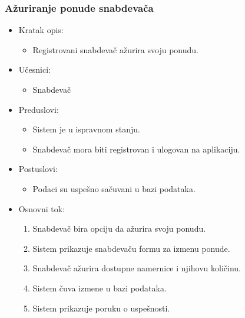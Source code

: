 \subsubsection{Ažuriranje ponude snabdevača}

\begin{itemize}
    \item Kratak opis:
        \begin{itemize}
            \item Registrovani snabdevač ažurira svoju ponudu.
        \end{itemize}
    \item Učesnici:
        \begin{itemize}
            \item Snabdevač
        \end{itemize}
    \item Preduslovi:
        \begin{itemize}
            \item Sistem je u ispravnom stanju.
            \item Snabdevač mora biti registrovan i ulogovan na aplikaciju.
        \end{itemize}
    \item Postuslovi:
        \begin{itemize}
            \item Podaci su uspešno sačuvani u bazi podataka.
        \end{itemize}
    \item Osnovni tok:
        \begin{enumerate}
            \item Snabdevač bira opciju da ažurira svoju ponudu.
            \item Sistem prikazuje snabdevaču formu za izmenu ponude.
            \item Snabdevač ažurira dostupne namernice i njihovu količinu.
            \item Sistem čuva izmene u bazi podataka.
            \item Sistem prikazuje poruku o uspešnosti. 
        \end{enumerate}
\end{itemize}


